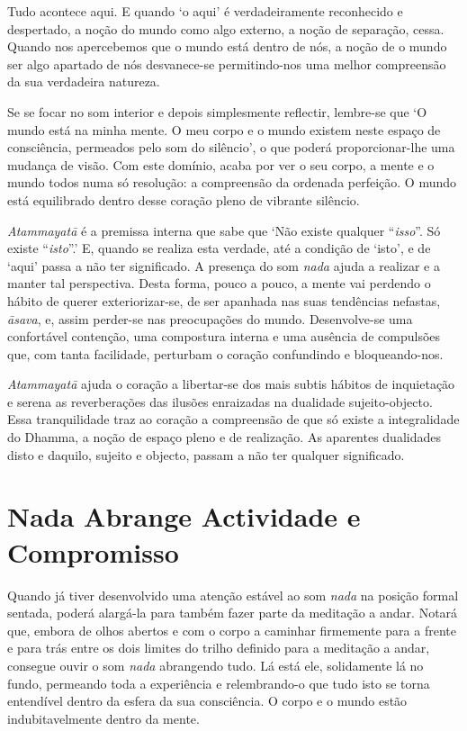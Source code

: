 Tudo acontece aqui. E quando `o aqui' é verdadeiramente reconhecido e
despertado, a noção do mundo como algo externo, a noção de separação,
cessa. Quando nos apercebemos que o mundo está dentro de nós, a noção de
o mundo ser algo apartado de nós desvanece-se permitindo-nos uma melhor
compreensão da sua verdadeira natureza.

Se se focar no som interior e depois simplesmente reflectir, lembre-se
que `O mundo está na minha mente. O meu corpo e o mundo existem neste
espaço de consciência, permeados pelo som do silêncio', o que poderá
proporcionar-lhe uma mudança de visão. Com este domínio, acaba por ver o
seu corpo, a mente e o mundo todos numa só resolução: a compreensão da
ordenada perfeição. O mundo está equilibrado dentro desse coração pleno
de vibrante silêncio.

\emph{Atammayatā} é a premissa interna que sabe que `Não existe qualquer
``\emph{isso}''. Só existe ``\emph{isto}''.' E, quando se realiza esta
verdade, até a condição de `isto', e de `aqui' passa a não ter
significado. A presença do som \emph{nada} ajuda a realizar e a manter
tal perspectiva. Desta forma, pouco a pouco, a mente vai perdendo o
hábito de querer exteriorizar-se, de ser apanhada nas suas tendências
nefastas, \emph{āsava}, e, assim perder-se nas preocupações do mundo.
Desenvolve-se uma confortável contenção, uma compostura interna e uma
ausência de compulsões que, com tanta facilidade, perturbam o coração
confundindo e bloqueando-nos.

\emph{Atammayatā} ajuda o coração a libertar-se dos mais subtis hábitos
de inquietação e serena as reverberações das ilusões enraizadas na
dualidade sujeito-objecto. Essa tranquilidade traz ao coração a
compreensão de que só existe a integralidade do Dhamma, a noção de
espaço pleno e de realização. As aparentes dualidades disto e daquilo,
sujeito e objecto, passam a não ter qualquer significado.

\section{Nada Abrange Actividade e Compromisso}

Quando já tiver desenvolvido uma atenção estável ao som \emph{nada} na
posição formal sentada, poderá alargá-la para também fazer parte da
meditação a andar. Notará que, embora de olhos abertos e com o corpo a
caminhar firmemente para a frente e para trás entre os dois limites do
trilho definido para a meditação a andar, consegue ouvir o som
\emph{nada} abrangendo tudo. Lá está ele, solidamente lá no fundo,
permeando toda a experiência e relembrando-o que tudo isto se torna
entendível dentro da esfera da sua consciência. O corpo e o mundo estão
indubitavelmente dentro da mente.

